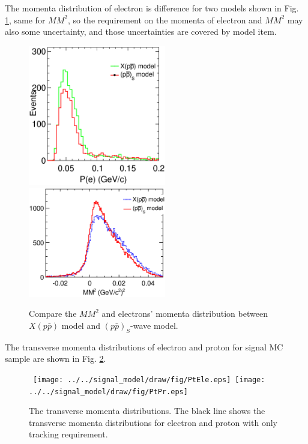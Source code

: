 The momenta distribution of electron is difference for two models shown
in Fig. \ref{Fig: compare pele}, same for $MM^{2}$, so the requirement
on the momenta of electron and $MM^{2}$ may also some uncertainty, and
those uncertainties are covered by model item.
\begin{figure}[htbp]
    \centering 
    \includegraphics[width = 6cm ]{section/append/fig/momentum_ele_signalMC_PHSP.eps}
    \includegraphics[width = 6cm ]{section/append/fig/MM_signalMC_PHSP.eps}
    \caption{Compare the $MM^{2}$ and electrons' momenta distribution
    between $X(p\bar{p})$ model and $(p\bar{p})_{S}$-wave model.}
    \label{Fig: compare pele}
\end{figure}

The transverse momenta distributions of electron and proton for signal
MC sample are shown in Fig. \ref{Fig: transverse momenta}.
\begin{figure}[htbp]  %
    \begin{center}
        \mbox{
            \texttt{[image: ../../signal\_model/draw/fig/PtEle.eps]}
            \texttt{[image: ../../signal\_model/draw/fig/PtPr.eps]}
        }
    \end{center}
    \caption{The transverse momenta distributions. The black line shows
        the transverse momenta distributions for electron and proton 
    with only tracking requirement.}
    \label{Fig: transverse momenta}
\end{figure}

